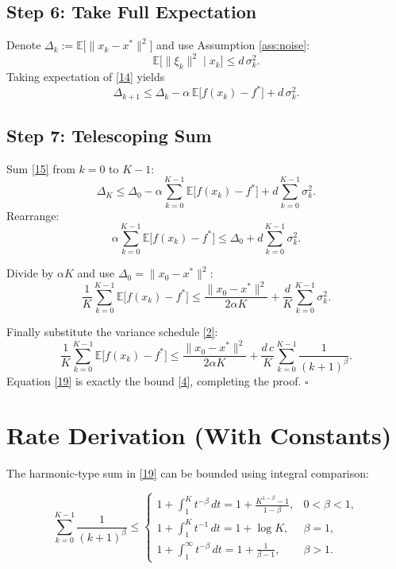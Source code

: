 \documentclass{article}
\newcommand{\E}{\mathbb{E}}
\begin{document}
\subsection*{Step 6: Take Full Expectation}
Denote $\Delta_{k}:=\E\!\bigl[\|x_{k}-x^{*}\|^{2}\bigr]$ and use Assumption \ref{ass:noise}:
\[
\E\!\bigl[\|\xi_{k}\|^{2}\mid x_{k}\bigr]\le d\,\sigma_{k}^{2}.
\]
Taking expectation of \eqref{14} yields
\[
\Delta_{k+1}\le \Delta_{k}
   -\alpha\,\E\!\bigl[f(x_{k})-f^{*}\bigr]
   +d\,\sigma_{k}^{2}.                                   \tag{15}
\]

\subsection*{Step 7: Telescoping Sum}
Sum \eqref{15} from $k=0$ to $K-1$:
\[
\Delta_{K}\le \Delta_{0}
   -\alpha\sum_{k=0}^{K-1}\E\!\bigl[f(x_{k})-f^{*}\bigr]
   +d\sum_{k=0}^{K-1}\sigma_{k}^{2}.                     \tag{16}
\]
Rearrange:
\[
\alpha\sum_{k=0}^{K-1}\E\!\bigl[f(x_{k})-f^{*}\bigr]
\le \Delta_{0}+d\sum_{k=0}^{K-1}\sigma_{k}^{2}.          \tag{17}
\]

Divide by $\alpha K$ and use $\Delta_{0}=\|x_{0}-x^{*}\|^{2}$:
\[
\frac{1}{K}\sum_{k=0}^{K-1}\E\!\bigl[f(x_{k})-f^{*}\bigr]
\le \frac{\|x_{0}-x^{*}\|^{2}}{2\alpha K}
   +\frac{d}{K}\sum_{k=0}^{K-1}\sigma_{k}^{2}.          \tag{18}
\]

Finally substitute the variance schedule \eqref{2}:
\[
\frac{1}{K}\sum_{k=0}^{K-1}\E\!\bigl[f(x_{k})-f^{*}\bigr]
\le \frac{\|x_{0}-x^{*}\|^{2}}{2\alpha K}
   +\frac{d\,c}{K}\sum_{k=0}^{K-1}\frac{1}{(k+1)^{\beta}}.
\tag{19}
\]
Equation \eqref{19} is exactly the bound \eqref{4}, completing the proof. \hfill $\square$

\section*{Rate Derivation (With Constants)}
The harmonic‑type sum in \eqref{19} can be bounded using integral comparison:

\[
\sum_{k=0}^{K-1}\frac{1}{(k+1)^{\beta}}
\le
\begin{cases}
1+\displaystyle\int_{1}^{K}\!t^{-\beta}\,dt
=1+\frac{K^{1-\beta}-1}{1-\beta}, & 0<\beta<1,\\[6pt]
1+\displaystyle\int_{1}^{K}\!t^{-1}\,dt
=1+\log K, & \beta=1,\\[6pt]
1+\displaystyle\int_{1}^{\infty}\!t^{-\beta}\,dt
=1+\frac{1}{\beta-1}, & \beta>1.
\end{cases}
\tag{20}
\]
\end{document}
